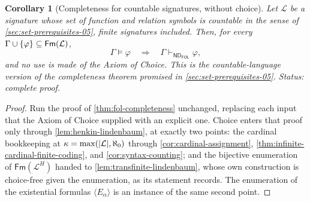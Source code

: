 \documentclass[11pt,oneside,openany]{book}
\theoremstyle{definition}
\theoremstyle{plain}
\newtheorem{corollary}[definition]{Corollary}
\theoremstyle{remark}
\DeclarePairedDelimiter{\set}{\lbrace}{\rbrace}
\DeclarePairedDelimiter{\abs}{\lvert}{\rvert}
\newcommand{\Lang}{\mathcal{L}}
\newcommand{\Fm}{\mathsf{Fm}}
\newcommand{\entails}{\models}
\newcommand{\derives}{\vdash}
\newcommand{\ND}{\mathsf{ND}}
\newcommand{\FOL}{\mathsf{FOL}}
\begin{document}
\begin{corollary}[Completeness for countable signatures, without choice]
\label{cor:fol-completeness-countable}
Let \(\Lang\) be a signature whose set of function and relation symbols
is countable in the sense of \cref{sec:set-prerequisites-05}, finite
signatures included.  Then, for every
\(\Gamma\cup\set{\varphi}\subseteq\Fm(\Lang)\),
\[
 \Gamma\entails\varphi
 \quad\Longrightarrow\quad
 \Gamma\derives_{\ND_{\FOL}}\varphi,
\]
and no use is made of the Axiom of Choice.  This is the
countable-language version of the completeness theorem promised in
\cref{sec:set-prerequisites-05}.
\textit{Status: complete proof.}
\end{corollary}
\begin{proof}
Run the proof of \cref{thm:fol-completeness} unchanged, replacing each
input that the Axiom of Choice supplied with an explicit one.  Choice
enters that proof only through \cref{lem:henkin-lindenbaum}, at exactly
two points: the cardinal bookkeeping at
\(\kappa=\max(\abs{\Lang},\aleph_0)\) through
\cref{cor:cardinal-assignment}, \cref{thm:infinite-cardinal-finite-coding},
and \cref{cor:syntax-counting}; and the bijective enumeration of
\(\Fm(\Lang^H)\) handed to \cref{lem:transfinite-lindenbaum}, whose own
construction is choice-free given the enumeration, as its statement
records.  The enumeration of the existential formulas
\(\langle E_\alpha\rangle\) is an instance of the same second point.


\end{proof}
\end{document}
